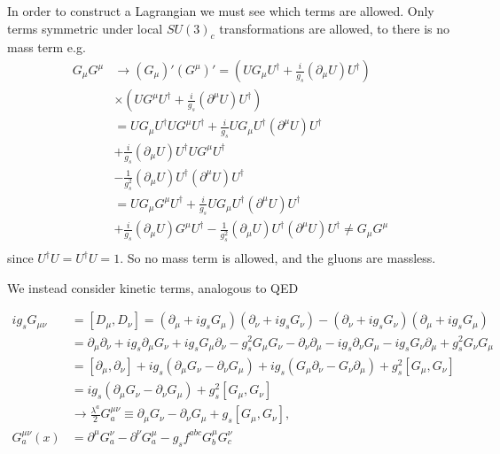 \documentclass[11pt]{article}
\begin{document}
\begin{multicols}{2}
\begin{flushleft}
In order to construct a Lagrangian we must see which terms are allowed. Only terms symmetric under local $SU(3)_c$ transformations are allowed, to there is no mass term e.g.
\begin{align*}
G_{\mu} G^{\mu} &\rightarrow (G_{\mu})'(G^{\mu})' = (U G_{\mu} U^{\dagger} + \frac{i}{g_s} (\partial_{\mu} U) U^{\dagger})\\
& \times (U G^{\mu} U^{\dagger} + \frac{i}{g_s} (\partial^{\mu} U) U^{\dagger})\\
&= U G_{\mu} U^{\dagger} U G^{\mu} U^{\dagger} + \frac{i}{g_s}U G_{\mu} U^{\dagger}  (\partial^{\mu} U)U^{\dagger}\\
&+  \frac{i}{g_s} (\partial_{\mu} U) U^{\dagger}U G^{\mu} U^{\dagger}\\
& - \frac{1}{g_s^2} (\partial_{\mu} U) U^{\dagger} (\partial^{\mu} U) U^{\dagger}\\
&= U G_{\mu}  G^{\mu} U^{\dagger} + \frac{i}{g_s}U G_{\mu} U^{\dagger}  (\partial^{\mu} U)U^{\dagger}\\
&+  \frac{i}{g_s} (\partial_{\mu} U) G^{\mu} U^{\dagger} - \frac{1}{g_s^2} (\partial_{\mu} U) U^{\dagger} (\partial^{\mu} U) U^{\dagger} \neq G_{\mu}G^{\mu}\\
\end{align*}
since $U^{\dagger} U = U^{\dagger} U = 1$. So no mass term is allowed, and the gluons are massless.
\end{flushleft}

\pagebreak

\begin{flushleft}
 We instead consider kinetic terms, analogous to QED
 \end{flushleft}
\end{multicols}
\begin{align*}
i g_s G_{\mu \nu} &= [D_{\mu}, D_{\nu}] = (\partial_{\mu} + ig_s G_{\mu})(\partial_{\nu} + ig_s G_{\nu} )- (\partial_{\nu} + ig_s G_{\nu} ) (\partial_{\mu} + ig_s G_{\mu} )\\
&= \partial_{\mu} \partial_{\nu}+ ig_s \partial_{\mu}  G_{\nu} +ig_s G_{\mu} \partial_{\nu}  - g_s^2 G_{\mu} G_{\nu}
- \partial_{\nu} \partial_{\mu}- ig_s\partial_{\nu}  G_{\mu} -ig_s G_{\nu} \partial_{\mu}  + g_s^2 G_{\nu} G_{\mu}\\
&= [\partial_{\mu}, \partial_{\nu}]+ ig_s (\partial_{\mu}  G_{\nu} - \partial_{\nu}  G_{\mu}) +ig_s (G_{\mu} \partial_{\nu}- G_{\nu} \partial_{\mu})  + g_s^2 [G_{\mu}, G_{\nu}]\\
&= ig_s (\partial_{\mu}  G_{\nu} - \partial_{\nu}  G_{\mu})   + g_s^2 [G_{\mu}, G_{\nu}]\\
& \rightarrow \frac{\lambda^a}{2} G_a^{\mu \nu} \equiv \partial_{\mu} G_{\nu} - \partial_{\nu} G_{\mu} + g_s [G_{\mu}, G_{\nu}],\\
G_a^{\mu \nu} (x) &=  \partial^{\mu} G^{\nu}_a - \partial^{\nu} G^{\mu}_a - g_s f^{abc} G^{\mu}_b G^{\nu}_c
\end{align*}
\end{document}
